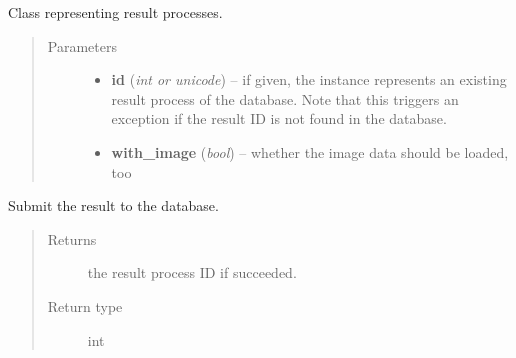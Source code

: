\documentclass[a4paper,11pt,english]{sphinxmanual}
\begin{document}
\begin{fulllineitems}
\label{programming/remote_client:jb_remote.samples.Result}
Class representing result processes.
\begin{quote}\begin{description}
\item[{Parameters}] \leavevmode\begin{itemize}
\item {} 
\textbf{id} (\emph{int or unicode}) -- if given, the instance represents an existing result process
of the database.  Note that this triggers an exception if the
result ID is not found in the database.

\item {} 
\textbf{with\_image} (\emph{bool}) -- whether the image data should be loaded, too

\end{itemize}

\end{description}\end{quote}

\begin{fulllineitems}
\label{programming/remote_client:jb_remote.samples.Result.submit}
Submit the result to the database.
\begin{quote}\begin{description}
\item[{Returns}] \leavevmode
the result process ID if succeeded.

\item[{Return type}] \leavevmode
int

\end{description}\end{quote}

\end{fulllineitems}


\end{fulllineitems}

\end{document}

